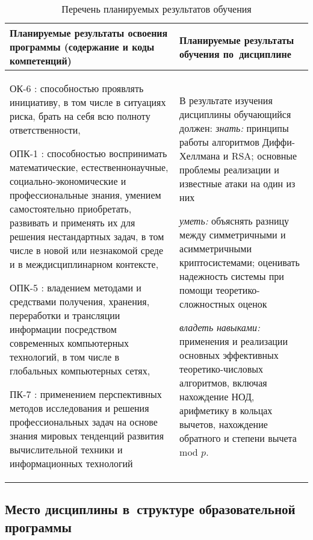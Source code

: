 \documentclass[a4paper,12pt]{article}
\begin{document}
\begin{longtable}{|p{45mm}|p{109mm}|}
  \caption{Перечень планируемых результатов обучения}\\
  \hline
  \centering
  Планируемые результаты освоения программы (содержание и коды компетенций) & 
  \centering\arraybackslash
  Планируемые результаты обучения по~дисциплине
  \\
  \hline
  
  ОК-6 : способностью проявлять инициативу, в том числе в ситуациях риска, брать на себя всю полноту ответственности, \par 
  
  ОПК-1 : способностью воспринимать математические, естественнонаучные, социально-экономические и профессиональные знания, умением самостоятельно приобретать, развивать и применять их для решения нестандартных задач, в том числе в новой или незнакомой среде и в междисциплинарном контексте, \par 
  
  ОПК-5 : владением методами и средствами получения, хранения, переработки и трансляции информации посредством современных компьютерных технологий, в том числе в глобальных компьютерных сетях, \par 
  
  ПК-7 : применением перспективных методов исследования и решения профессиональных задач на основе знания мировых тенденций развития вычислительной техники и информационных технологий
  & 
  В результате изучения дисциплины обучающийся должен:\newline
  \emph{знать:}
  принципы работы алгоритмов Диффи-Хеллмана и RSA; основные проблемы реализации и известные атаки на один из них
  

  \emph{уметь:}
  объяснять разницу между симметричными и асимметричными криптосистемами; оценивать надежность системы при помощи теоретико-сложностных оценок
  

  \emph{владеть навыками:}
  применения и реализации основных эффективных теоретико-числовых алгоритмов, включая нахождение НОД, арифметику в кольцах вычетов, нахождение обратного и степени вычета mod $p$.
  
  \\
  \hline
  \end{longtable}


\subsection{Место дисциплины в~структуре образовательной программы}
\end{document}
